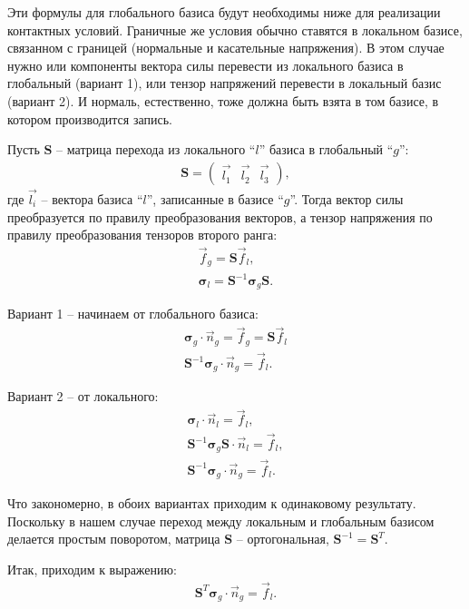 Эти формулы для глобального базиса будут необходимы ниже для реализации контактных условий. Граничные же условия обычно ставятся в локальном базисе, связанном с границей (нормальные и касательные напряжения). В этом случае нужно или компоненты вектора силы перевести из локального базиса в глобальный (вариант 1), или тензор напряжений перевести в локальный базис (вариант 2). И нормаль, естественно, тоже должна быть взята в том базисе, в котором производится запись.

Пусть $\mathbf{S}$ -- матрица перехода из локального ``$l$'' базиса в глобальный ``$g$'':
\begin{align}
	\mathbf{S} =
	\left( \begin{array}{cccccccccccc}
	 \vec{l_1} & \vec{l_2} & \vec{l_3}
	\end{array} \right),
\end{align}
где $\vec{l_i}$ -- вектора базиса ``$l$'', записанные в базисе ``$g$''. Тогда вектор силы преобразуется по правилу преобразования векторов, а тензор напряжения по правилу преобразования тензоров второго ранга:
\begin{eqnarray}
	\vec{f}_g = \mathbf{S} \vec{f}_l, \\
	\mathbf{\sigma}_l = \mathbf{S}^{-1} \mathbf{\sigma}_g \mathbf{S}.
\end{eqnarray}

Вариант 1 -- начинаем от глобального базиса:
\begin{eqnarray}
	\mathbf{\sigma}_g \cdot \vec{n}_g = \vec{f}_g = \mathbf{S} \vec{f}_l \\
	\mathbf{S}^{-1} \mathbf{\sigma}_g \cdot \vec{n}_g = \vec{f}_l.
\end{eqnarray}

Вариант 2 -- от локального:
\begin{eqnarray}
	\mathbf{\sigma}_l \cdot \vec{n}_l = \vec{f}_l, \\
	\mathbf{S}^{-1} \mathbf{\sigma}_g \mathbf{S} \cdot \vec{n}_l = \vec{f}_l, \\
	\mathbf{S}^{-1} \mathbf{\sigma}_g \cdot \vec{n}_g = \vec{f}_l.
\end{eqnarray}

Что закономерно, в обоих вариантах приходим к одинаковому результату. Поскольку в нашем случае переход между локальным и глобальным базисом делается простым поворотом, матрица $\mathbf{S}$ -- ортогональная, $\mathbf{S}^{-1} = \mathbf{S}^T$.

Итак, приходим к выражению:
\begin{eqnarray}
	\mathbf{S}^T \mathbf{\sigma}_g \cdot \vec{n}_g = \vec{f}_l.
\end{eqnarray}

